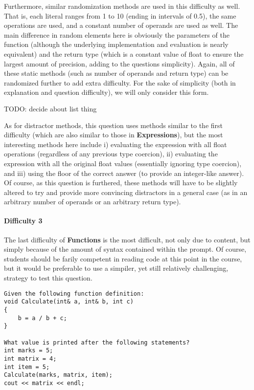 \documentclass{article}
\begin{document}
Furthermore, similar randomization methods are used in this difficulty as well. That is, each literal ranges from 1 to 10 (ending in intervals of 0.5), the same operations are used, and a constant number of operands are used as well. The main difference in random elements here 
is obviously the parameters of the function (although the underlying implementation and evaluation is nearly equivalent) and the return type (which is a constant value of float to ensure the largest amount of precision, adding to the questions simplicity). Again, all of these static methods (such as number of operands and return type) can be randomized further to add extra difficulty. For the sake of simplicity (both in explanation and question difficulty), we will only consider this form.

TODO: decide about list thing

As for distractor methods, this question uses methods similar to the first difficulty (which are also similar to those in \textbf{Expressions}), but the most interesting methods here include i) evaluating the expression with all float operations (regardless of any previous type coercion), ii) evaluating the expression with all the original float values (essentially ignoring type coercion), and iii) using the floor of the correct answer (to provide an integer-like answer). Of course, as this question is furthered, these methods will have to be slightly altered to try and provide more convincing distractors in a general case (as in an arbitrary number of operands or an arbitrary return type).

\paragraph{Difficulty 3} \hfill \par

The last difficulty of \textbf{Functions} is the most difficult, not only due to content, but simply because of the amount of syntax contained within the prompt. Of course, students should be farily competent in reading code at this point in the course, but it would be preferable to use a simpiler, yet still relatively challenging, strategy to test this question.

\begin{lstlisting}[caption={\textbf{Functions} Difficulty 3 Example}, label=lst-functions_3, float]
Given the following function definition:
void Calculate(int& a, int& b, int c)
{
	b = a / b + c;
}

What value is printed after the following statements?
int marks = 5;
int matrix = 4;
int item = 5;
Calculate(marks, matrix, item);
cout << matrix << endl;
\end{lstlisting}
\end{document}
